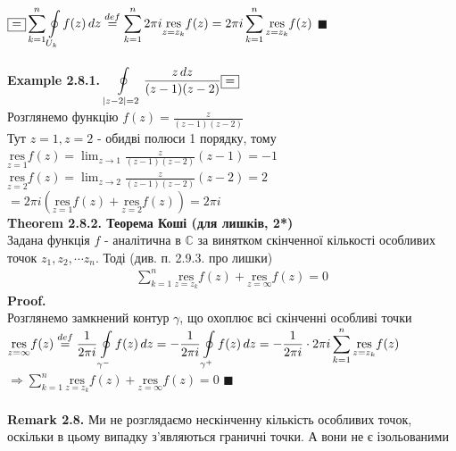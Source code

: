 \documentclass[a4paper, 14pt]{extarticle}
\def\residue#1#2{\underset{z = {#1}}{\textrm{res}} {#2}}
\def\hugespace{\vspace{5mm} \\}
\begin{document}
$\boxed{=} \displaystyle \sum_{k=1}^n \oint\displaylimits_{U_k} f(z)\,dz \overset{def}{=} \sum_{k=1}^n 2\pi i \residue{z_k}{f(z)} = 2\pi i \sum_{k=1}^n \residue{z_k}{f(z)}$ $\blacksquare$\\
\hugespace
\textbf{Example 2.8.1.} $\displaystyle \oint\displaylimits_{|z-2|=2} \frac{z\,dz}{(z-1)(z-2)} \boxed{=}$\\
Розглянемо функцію $\displaystyle f(z) = \frac{z}{(z-1)(z-2)}$\\
Тут $z = 1, z = 2$ - обидві полюси 1 порядку, тому\\
$\displaystyle \residue{1}{f(z)} = \lim_{z \to 1} \frac{z}{(z-1)(z-2)} (z-1) = -1$\\
$\displaystyle \residue{2}{f(z)} = \lim_{z \to 2} \frac{z}{(z-1)(z-2)} (z-2) = 2$\\
$\boxed{=} 2 \pi i (\residue{1}{f(z)} + \residue{2}{f(z)}) = 2 \pi i$
\hugespace

\textbf{Theorem 2.8.2. Теорема Коші (для лишків, 2*)}\\
Задана функція $f$ - аналітична в $\mathbb{C}$ за винятком скінченної кількості особливих точок $z_1,z_2,\cdots z_n$. Тоді (див. п. 2.9.3. про лишки)
\begin{align*}
\sum_{k=1}^{n} \residue{z_k}{f(z)} + \residue{\infty}{f(z)} = 0
\end{align*}
\textbf{Proof.}\\
Розглянемо замкнений контур $\gamma$, що охоплює всі скінченні особливі точки\\
$\displaystyle \residue{\infty}{f(z)} \overset{def}{=} \frac{1}{2 \pi i} \oint\displaylimits_{\gamma^-} f(z) \,dz = -\frac{1}{2 \pi i} \oint\displaylimits_{\gamma^+} f(z) \,dz = -\frac{1}{2 \pi i} \cdot 2 \pi i\sum_{k=1}^{n}  \residue{z_k}{f(z)}$\\
$\Rightarrow\displaystyle \sum_{k=1}^{n} \residue{z_k}{f(z)} + \residue{\infty}{f(z)} = 0$ $\blacksquare$\\
\hugespace
\textbf{Remark 2.8.} Ми не розглядаємо нескінченну кількість особливих точок, оскільки в цьому випадку з'являються граничні точки. А вони не є ізольованими
\hugespace
\end{document}
